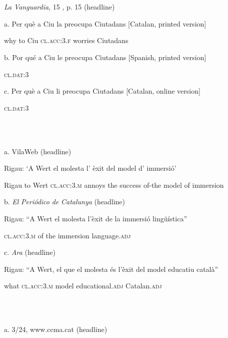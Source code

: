 \documentclass[output=paper,modfonts,nonflat]{langsci/langscibook}
\begin{document}
\ea%
    \label{ex:key:5}
    \gll\\
        \\
    \glt
    \z

         \textit{La} \textit{Vanguardia}, 15 \citealt{May2015}, p. 15 (headline)

      a. Per què a  Ciu la                preocupa Ciutadans  [Catalan, printed version]

          why      to Ciu \textsc{cl.acc:3.f} worries    Ciutadans

      b. Por qué a  Ciu le            preocupa Ciutadans  [Spanish, printed version]

                                     \textsc{cl.dat:3}

      c. Per què a  Ciu li             preocupa Ciutadans  [Catalan, online version]

                                    \textsc{cl.dat:3}

\ea%
    \label{ex:key:6}
    \gll\\
        \\
    \glt
    \z

         a. VilaWeb (headline)

          Rigau: ‘A Wert el                 molesta l’   èxit       del     model  d’ immersió’

          Rigau   to Wert \textsc{cl.acc:3.m} annoys  the success of-the model of immersion

      b. \textit{El} \textit{Periódico} \textit{de} \textit{Catalunya} (headline)

          Rigau: “A Wert el                molesta l’èxit de la   immersió   lingüística”

                                    \textsc{cl.acc:3.m}                        of the immersion language.\textsc{adj}

      c. \textit{Ara} (headline)

          Rigau: “A Wert, el que el                 molesta és l’èxit del model educatiu             català”

                                        what   \textsc{cl.acc:3.m}                                  model educational.\textsc{adj} Catalan.\textsc{adj}

\ea%
    \label{ex:key:7}
    \gll\\
        \\
    \glt
    \z

         a. 3/24, www.ccma.cat (headline)
\end{document}
